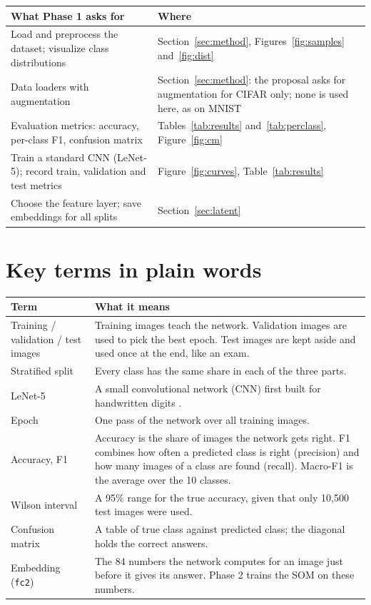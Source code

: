 \documentclass[11pt]{article}
\begin{document}
{\small
\renewcommand{\arraystretch}{1.12}
\begin{tabularx}{\textwidth}{|>{\raggedright\arraybackslash}p{}|X|}
\hline
\textbf{What Phase 1 asks for} & \textbf{Where} \\ \hline
Load and preprocess the dataset; visualize class distributions & Section~\ref{sec:method}, Figures~\ref{fig:samples} and~\ref{fig:dist} \\ \hline
Data loaders with augmentation & Section~\ref{sec:method}: the proposal asks for augmentation for CIFAR only; none is used here, as on MNIST \\ \hline
Evaluation metrics: accuracy, per-class F1, confusion matrix & Tables~\ref{tab:results} and~\ref{tab:perclass}, Figure~\ref{fig:cm} \\ \hline
Train a standard CNN (LeNet-5); record train, validation and test metrics & Figure~\ref{fig:curves}, Table~\ref{tab:results} \\ \hline
Choose the feature layer; save embeddings for all splits & Section~\ref{sec:latent} \\ \hline
\end{tabularx}}

\section{Key terms in plain words}

{\small
\renewcommand{\arraystretch}{1.12}
\begin{tabularx}{\textwidth}{|>{\raggedright\arraybackslash}p{}|X|}
\hline
\textbf{Term} & \textbf{What it means} \\ \hline
Training / validation / test images & Training images teach the network. Validation images are used to pick the best epoch. Test images are kept aside and used once at the end, like an exam. \\ \hline
Stratified split & Every class has the same share in each of the three parts. \\ \hline
LeNet-5 & A small convolutional network (CNN) first built for handwritten digits \cite{lecun1998gradient}. \\ \hline
Epoch & One pass of the network over all training images. \\ \hline
Accuracy, F1 & Accuracy is the share of images the network gets right. F1 combines how often a predicted class is right (precision) and how many images of a class are found (recall). Macro-F1 is the average over the 10 classes. \\ \hline
Wilson interval & A 95\% range for the true accuracy, given that only 10,500 test images were used. \\ \hline
Confusion matrix & A table of true class against predicted class; the diagonal holds the correct answers. \\ \hline
Embedding (\texttt{fc2}) & The 84 numbers the network computes for an image just before it gives its answer. Phase 2 trains the SOM on these numbers. \\ \hline
\end{tabularx}}
\end{document}
